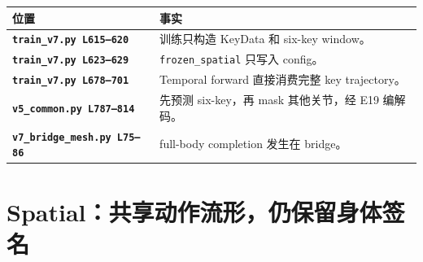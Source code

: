 \documentclass[10pt,a4paper,fontset=none]{ctexart}
\newcommand{\code}[1]{\texttt{\small #1}}
\begin{document}
\begin{tabularx}{\linewidth}{@{}>{\bfseries}p{43mm}Y@{}}
\toprule
位置 & 事实 \\
\midrule
\code{train\_v7.py L615--620} & 训练只构造 KeyData 和 six-key window。\\
\code{train\_v7.py L623--629} & \code{frozen\_spatial} 只写入 config。\\
\code{train\_v7.py L678--701} & Temporal forward 直接消费完整 key trajectory。\\
\code{v5\_common.py L787--814} & 先预测 six-key，再 mask 其他关节，经 E19 编解码。\\
\code{v7\_bridge\_mesh.py L75--86} & full-body completion 发生在 bridge。\\
\bottomrule
\end{tabularx}

\section{Spatial：共享动作流形，仍保留身体签名}
\end{document}
